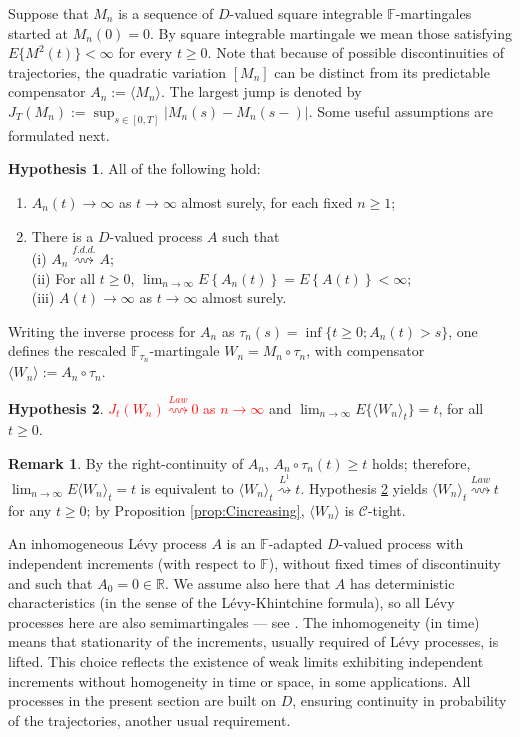 \documentclass[final]{amsart}
\theoremstyle{definition}
\newtheorem{rem}{Remark}[section]
\newtheorem{hyp}{Hypothesis}[section]
\numberwithin{equation}{section}
\def\disp{\displaystyle}
\def\crochet#1{\langle #1 \rangle}
\newcommand{\dR}{\ensuremath{\mathbb{R}}}
\newcommand{\BR}[1]{\textcolor{red}{#1}}
\begin{document}
Suppose that $M_n$ is a sequence of $D$-valued square integrable $\mathbb{F}$-martingales started at $M_n(0)=0$.
By square integrable martingale we mean those satisfying $E\{M^2(t)\}<\infty$ for every $t\ge0$.
Note that because of possible discontinuities of trajectories, the quadratic variation $[M_n]$ can be distinct from its predictable compensator
$A_n:=\crochet{ M_n }$. The largest jump is denoted by $J_T(M_n) := \sup_{s\in [0,T]}|M_n(s)-M_n(s-)|$.
Some useful assumptions are formulated next.
\begin{hyp}\label{hyp:an_unbounded}
All of the following hold:
\begin{enumerate}
\item[(a)] $A_n(t) \to\infty$ as $t\to\infty$ almost surely, for each fixed $n\ge1$;
\item[(b)] There is a $D$-valued process $A$ such that \\
(i) $A_n \stackrel{f.d.d.}{\rightsquigarrow} A$; \\
(ii) For all $t\ge 0$, $\disp \lim_{n\to\infty} E\left\{A_n(t)\right\}=E\left\{A(t)\right\} < \infty$; \\
(iii) $A(t) \to\infty$ as $t\to\infty$ almost surely.
\end{enumerate}
\end{hyp}
Writing the inverse process for $A_n$ as $\tau_n(s) = \inf\{t\ge0; A_n(t)>s\}$,
one defines the rescaled $\mathbb{F}_{\tau_n}$-martingale $W_n = M_n\circ \tau_n$,
with compensator $\crochet{ W_n } := A_n\circ \tau_n$.
\begin{hyp}\label{hyp:bm_limit}
\BR{$J_t(W_n)\stackrel{Law}{\rightsquigarrow} 0$ as $n\to\infty$} and
$\disp \lim_{n\to\infty}E\{\langle W_n\rangle_t\}  =t$, for all $t\ge0$.
\end{hyp}
\begin{rem}
By the right-continuity of $A_n$, $A_n\circ \tau_n(t)\ge t$ holds; therefore,
$\lim_{n\to\infty} E\crochet{ W_n }_t  =t$ is equivalent to $\crochet{ W_n }_t \stackrel{L^1}{\rightsquigarrow} t$.
Hypothesis \ref{hyp:bm_limit} yields $\crochet{ W_n }_t \stackrel{Law}{\rightsquigarrow} t$ for any $t\ge 0$;
by Proposition \ref{prop:Cincreasing}, $\crochet{ W_n }$ is $\mathcal{C}$-tight.
\end{rem}
An inhomogeneous L\'evy process $A$ is an $\mathbb{F}$-adapted $D$-valued process with independent increments (with respect to
$\mathbb{F}$), without fixed times of discontinuity and such that $A_0=0\in\dR$. We assume also here that $A$ has deterministic characteristics (in the sense of the L\'evy-Khintchine formula), so all L\'evy processes here are also semimartingales ---
see \citet[Theorem II.4.15]{Jacod/Shiryaev:2003}. The inhomogeneity (in time) means that stationarity of the increments, usually required of L\'evy processes, is lifted. This choice reflects the existence of weak limits exhibiting independent increments without homogeneity in time or space, in some applications. All processes in the present section are built on $D$, ensuring continuity in probability of the trajectories, another usual requirement.
\end{document}
